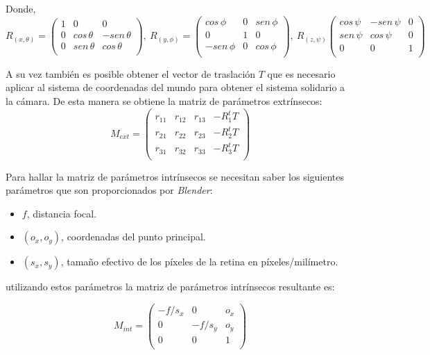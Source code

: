  Donde,
 \[R_{(x,\theta)} = \begin{pmatrix}
		1 &   0         &  0\\
		0 & cos\,\theta & -sen\,\theta\\
		0 & sen\,\theta & cos\,\theta\\ 
\end{pmatrix}, ~
R_{(y,\phi)}=\begin{pmatrix}
		cos\,\phi  & 0 & sen\,\phi\\
		0          & 1 & 0\\
		-sen\,\phi &0  & cos\,\phi\\ 
\end{pmatrix}, ~
R_{(z,\psi)}\begin{pmatrix}
		cos\,\psi & -sen\,\psi & 0\\
		sen\,\psi & cos\,\psi  & 0\\
		 0          & 0            & 1\\ 
\end{pmatrix}\]

A su vez también es posible obtener el vector de traslación $T$ que es necesario aplicar al sistema de coordenadas del mundo para obtener el sistema solidario a la cámara. De esta manera se obtiene la matriz de parámetros extrínsecos:
\[
		M_{ext}=\begin{pmatrix}
			r_{11} & r_{12} & r_{13} &-R^t_1 T\\
			r_{21} & r_{22} & r_{23} &-R^t_2 T\\
			r_{31} & r_{32} & r_{33} &-R^t_3 T\\
		\end{pmatrix}
\] 

Para hallar la matriz de parámetros intrínsecos se necesitan saber los siguientes parámetros que son proporcionados por \emph{Blender}: 
\begin{itemize}
\item $f$, distancia focal.
\item $(o_x, o_y)$, coordenadas del punto principal.
\item $(s_x,s_y)$, tamaño efectivo de los píxeles de la retina en píxeles/milímetro.
\end{itemize}

utilizando estos parámetros la matriz de parámetros intrínsecos resultante es:

\[M_{int}=\begin{pmatrix}
			-f/s_x & 0      & o_x\\
			0      & -f/s_y & o_y\\
			0      & 0      & 1\\
		\end{pmatrix} \]
 
